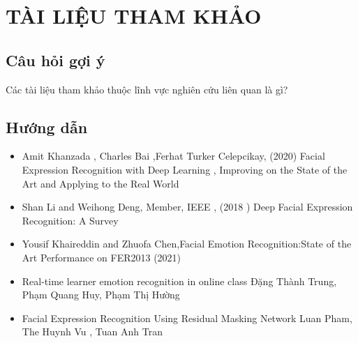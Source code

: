 \section*{TÀI LIỆU THAM KHẢO}
\subsection*{Câu hỏi gợi ý}
Các tài liệu tham khảo thuộc lĩnh vực nghiên cứu liên quan là gì?
\subsection*{Hướng dẫn}
\begin{itemize}
    \item Amit Khanzada , Charles Bai ,Ferhat Turker Celepcikay, (2020) Facial Expression Recognition with Deep Learning , Improving on the State of the Art and Applying to the Real World
    \item Shan Li and Weihong Deng, Member, IEEE , (2018 ) Deep Facial Expression Recognition: A Survey
    \item Yousif Khaireddin and Zhuofa Chen,Facial Emotion Recognition:State of the Art Performance on FER2013 (2021)
    \item Real-time learner emotion recognition in online class Đặng Thành Trung, Phạm Quang Huy, Phạm Thị Hường
    \item Facial Expression Recognition Using Residual  Masking Network  Luan Pham, The Huynh Vu , Tuan Anh Tran 
\end{itemize}
